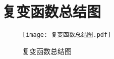\documentclass[12pt, a4paper, oneside, UTF8]{ctexbook}
\begin{document}
% 
\else
\fi

\chapter*{复变函数总结图}

\begin{figure}[h]
    \centering
    \texttt{[image: 复变函数总结图.pdf]}
    \caption{\label{fig:复变函数总结图} 复变函数总结图}
\end{figure}
    

\ifx\allfiles\undefined
\end{document}
